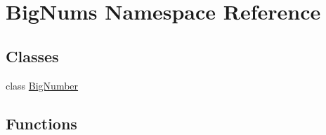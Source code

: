 \hypertarget{namespace_big_nums}{}\section{Big\+Nums Namespace Reference}
\label{namespace_big_nums}
\subsection*{Classes}
\begin{DoxyCompactItemize}
\item 
class \mbox{\hyperlink{class_big_nums_1_1_big_number}{Big\+Number}}
\end{DoxyCompactItemize}
\subsection*{Functions}
